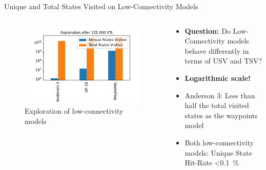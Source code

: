 \documentclass[aspectratio=169]{beamer}
\begin{document}
\begin{frame}{Unique and Total States Visited on Low-Connectivity Models}
    \begin{columns}
        \begin{column}{.5\textwidth}
            \begin{figure}
                \centering
                \includegraphics[width=\textwidth]{../../evaluation/output-assets/EXP-12-model-comparison-5.pdf}
                \caption{Exploration of low-connectivity models}
                \label{fig:evaluation:EXP-12}
            \end{figure}
        \end{column}
        \begin{column}{.5\textwidth}
            \begin{itemize}
                \item \textbf{Question:} Do Low-Connectivity models behave differently in terms of USV and TSV?
                \item \textbf{Logarithmic scale!}
                \item Anderson 3: Less than half the total visited states as the waypoints model
                \item Both low-connectivity models: Unique State Hit-Rate <\SI{0.1}{\percent}
            \end{itemize}
        \end{column}
    \end{columns}
\end{frame}
\end{document}
